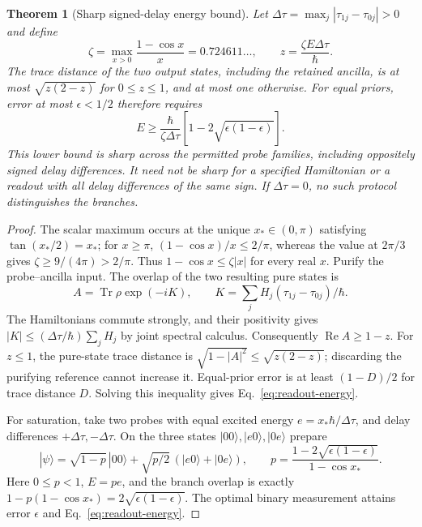 \documentclass[aps,pre,onecolumn,superscriptaddress,floatfix,longbibliography]{revtex4-2}
\newtheorem{theorem}{Theorem}
\begin{document}
\begin{theorem}[Sharp signed-delay energy bound]\label{thm:delayed-readout}
Let $\Delta\tau=\max_j|\tau_{1j}-\tau_{0j}|>0$ and define
\begin{equation}\label{eq:readout-zeta}
 \zeta=\max_{x>0}\frac{1-\cos x}{x}=0.724611\ldots,
 \qquad z=\frac{\zeta E\Delta\tau}{\hbar}.
\end{equation}
The trace distance of the two output states, including the retained ancilla,
is at most $\sqrt{z(2-z)}$ for $0\le z\le1$, and at most one otherwise.
For equal priors, error at most $\epsilon<1/2$ therefore requires
\begin{equation}\label{eq:readout-energy}
 E\ge\frac{\hbar}{\zeta\Delta\tau}
       \left[1-2\sqrt{\epsilon(1-\epsilon)}\right].
\end{equation}
This lower bound is sharp across the permitted probe families, including
oppositely signed delay differences. It need not be sharp for a specified
Hamiltonian or a readout with all delay differences of the same sign.
If $\Delta\tau=0$, no such protocol distinguishes the branches.
\end{theorem}
\begin{proof}
The scalar maximum occurs at the unique $x_*\in(0,\pi)$ satisfying
$\tan(x_*/2)=x_*$; for $x\ge\pi$, $(1-\cos x)/x\le2/\pi$, whereas
the value at $2\pi/3$ gives $\zeta\ge9/(4\pi)>2/\pi$.
Thus $1-\cos x\le\zeta|x|$ for every real $x$.
Purify the probe--ancilla input. The overlap of the two resulting pure states is
\[
 A=\operatorname{Tr}\rho\exp(-iK),\qquad
 K=\sum_jH_j(\tau_{1j}-\tau_{0j})/\hbar.
\]
The Hamiltonians commute strongly, and their positivity gives
$|K|\le(\Delta\tau/\hbar)\sum_jH_j$ by joint spectral calculus.
Consequently $\operatorname{Re}A\ge1-z$.
For $z\le1$, the pure-state trace distance is
$\sqrt{1-|A|^2}\le\sqrt{z(2-z)}$; discarding the purifying reference cannot
increase it. Equal-prior error is at least $(1-D)/2$ for trace distance $D$.
Solving this inequality gives Eq.~\eqref{eq:readout-energy}.

For saturation, take two probes with equal excited energy
$e=x_*\hbar/\Delta\tau$, and delay differences $+\Delta\tau,-\Delta\tau$.
On the three states $|00\rangle,|e0\rangle,|0e\rangle$ prepare
\[
 |\psi\rangle=\sqrt{1-p}\,|00\rangle
       +\sqrt{p/2}\,(|e0\rangle+|0e\rangle),\qquad
 p=\frac{1-2\sqrt{\epsilon(1-\epsilon)}}{1-\cos x_*}.
\]
Here $0\le p<1$, $E=pe$, and the branch overlap is exactly
$1-p(1-\cos x_*)=2\sqrt{\epsilon(1-\epsilon)}$. The optimal binary
measurement attains error $\epsilon$ and Eq.~\eqref{eq:readout-energy}.
\end{proof}
\end{document}
